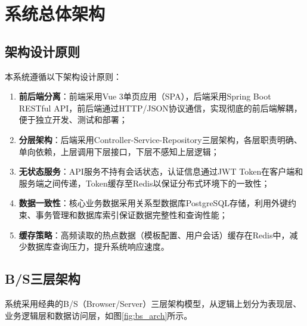 
\section{系统总体架构}

\subsection{架构设计原则}

本系统遵循以下架构设计原则：

\begin{enumerate}
    \item \textbf{前后端分离}：前端采用Vue 3单页应用（SPA），后端采用Spring Boot RESTful API，前后端通过HTTP/JSON协议通信，实现彻底的前后端解耦，便于独立开发、测试和部署；
    \item \textbf{分层架构}：后端采用Controller-Service-Repository三层架构，各层职责明确、单向依赖，上层调用下层接口，下层不感知上层逻辑；
    \item \textbf{无状态服务}：API服务不持有会话状态，认证信息通过JWT Token在客户端和服务端之间传递，Token缓存至Redis以保证分布式环境下的一致性；
    \item \textbf{数据一致性}：核心业务数据采用关系型数据库PostgreSQL存储，利用外键约束、事务管理和数据库索引保证数据完整性和查询性能；
    \item \textbf{缓存策略}：高频读取的热点数据（模板配置、用户会话）缓存在Redis中，减少数据库查询压力，提升系统响应速度。
\end{enumerate}

\subsection{B/S三层架构}

系统采用经典的B/S（Browser/Server）三层架构模型，从逻辑上划分为表现层、业务逻辑层和数据访问层，如图\ref{fig:bs_arch}所示。


